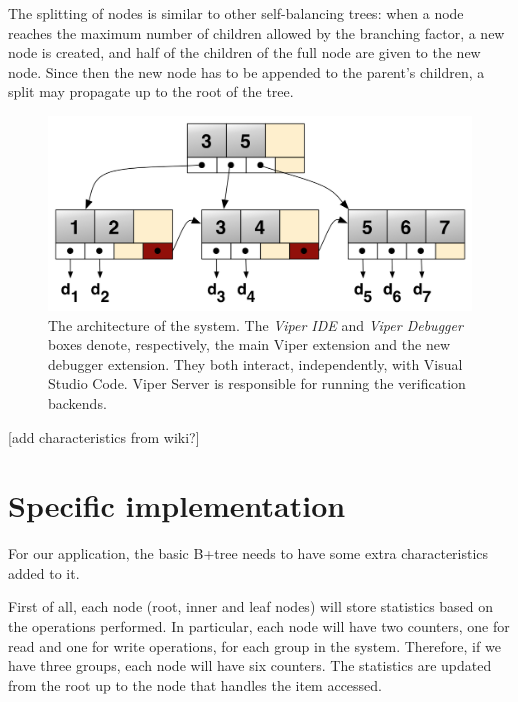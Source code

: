 The splitting of nodes is similar to other self-balancing trees: when a node reaches the maximum number of children allowed by the branching factor, a new node is created, and half of the children of the full node are given to the new node. Since then the new node has to be appended to the parent's children, a split may propagate up to the root of the tree.

\begin{figure}[htb]
    \centering
    \includegraphics{img/b+tree.png}
    \caption[The architecture of the system]{ The architecture of the system. The
      \textit{Viper IDE} and \textit{Viper Debugger} boxes denote, respectively,
      the main Viper extension and the new debugger extension. They both interact,
      independently, with Visual Studio Code. Viper Server is responsible for
      running the verification backends.}
    \label{fig:b+tree}
\end{figure}

[add characteristics from wiki?]

\section{Specific implementation}\label{sec:specific-implementation}
For our application, the basic B+tree needs to have some extra characteristics added to it. 

First of all, each node (root, inner and leaf nodes) will store statistics based on the operations performed. In particular, each node will have two counters, one for read and one for write operations, for each group in the system. Therefore, if we have three groups, each node will have six counters. The statistics are updated from the root up to the node that handles the item accessed.

